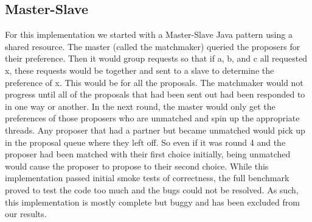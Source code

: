\subsection{Master-Slave}
For this implementation we started with a Master-Slave Java pattern using a shared resource. The master (called the matchmaker) queried the proposers for their preference. Then it would group requests so that if a, b, and c all requested x, these requests would be together and sent to a slave to determine the preference of x. This would be for all the proposals. The matchmaker would not progress until all of the proposals that had been sent out had been responded to in one way or another. In the next round, the master would only get the preferences of those proposers who are unmatched and spin up the appropriate threads. Any proposer that had a partner but became unmatched would pick up in the proposal queue where they left off. So even if it was round 4 and the proposer had been matched with their first choice initially, being unmatched would cause the proposer to propose to their second choice. While this implementation passed initial smoke tests of correctness, the full benchmark proved to test the code too much and the bugs could not be resolved. As such, this implementation is mostly complete but buggy and has been excluded from our results.